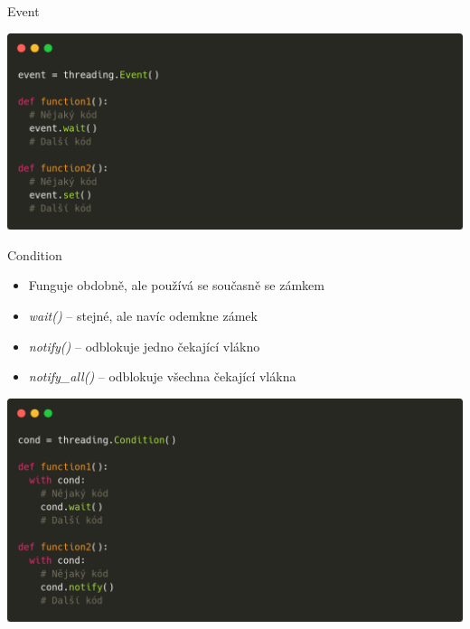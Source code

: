 \documentclass{beamer}
\begin{document}
\begin{frame}[fragile]{Event}
    \begin{center}
        \includegraphics[width=\textwidth]{obrazky/codes/carbon5.png}
    \end{center}
\end{frame}

\begin{frame}[fragile]{Condition}
    \begin{itemize}
        \item Funguje obdobně, ale používá se současně se zámkem

        \vskip 0.25in
        \item \textit{wait()} – stejné, ale navíc odemkne zámek
        \item \textit{notify()} – odblokuje jedno čekající vlákno
        \item \textit{notify\_all()} – odblokuje všechna čekající vlákna
    \end{itemize}
    \scriptsize

    \begin{center}
        \includegraphics[width=\textwidth]{obrazky/codes/carbon6.png}
    \end{center}
\end{frame}
\end{document}
